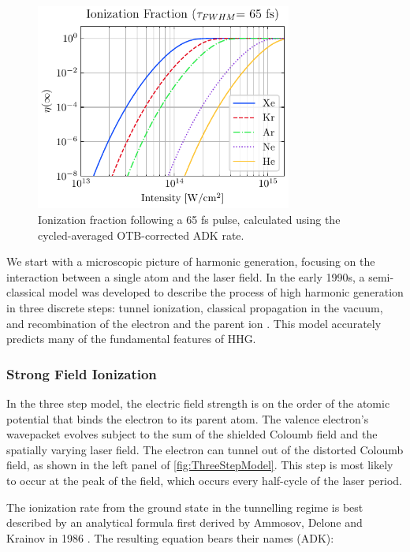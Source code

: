 \begin{figure}
	\centering
	\includegraphics[width=0.75\textwidth]{figures/chap1/ADK_ion_frac_TL.pdf}
	\caption{Ionization fraction following a 65 fs pulse, calculated using the cycled-averaged OTB-corrected ADK rate.}
	\label{fig:ADK_ion_frac}
\end{figure}

We start with a microscopic picture of harmonic generation, focusing on the interaction between a single atom and the laser field. In the early 1990s, a semi-classical model was developed to describe the process of high harmonic generation in three discrete steps: tunnel ionization, classical propagation in the vacuum, and recombination of the electron and the parent ion \cite{schaferThresholdIonizationHigh1993,corkumPlasmaPerspectiveStrong1993}. This model accurately predicts many of the fundamental features of HHG.

\subsubsection{Strong Field Ionization}

In the three step model, the electric field strength is on the order of the atomic potential that binds the electron to its parent atom. The valence electron's wavepacket evolves subject to the sum of the shielded Coloumb field and the spatially varying laser field. The electron can tunnel out of the distorted Coloumb field, as shown in the left panel of \cref{fig:ThreeStepModel}. This step is most likely to occur at the peak of the field, which occurs every half-cycle of the laser period.

The ionization rate from the ground state in the tunnelling regime is best described by an analytical formula first derived by Ammosov, Delone and Krainov in 1986 \cite{ammosovTunnelIonizationComplex1986,changFundamentalsAttosecondOptics2011,laiExperimentalInvestigationStrongfieldionization2017}. The resulting equation bears their names (ADK):

